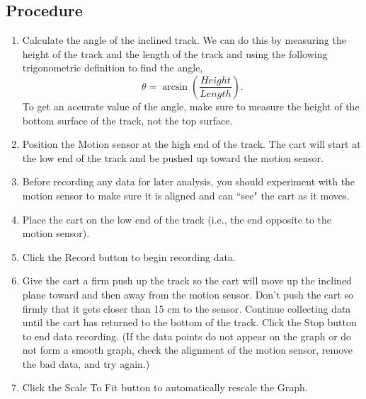 \documentclass[main.tex]{subfiles}
\begin{document}
\subsection*{Procedure}
\begin{enumerate}
\item
Calculate the angle of the inclined track. We can do this by measuring the height of the track and the length of the track and using the following trigonometric definition to find the angle,
\[
\theta=\arcsin\left(\frac{Height}{Length}\right).
\]
To get an accurate value of the angle, make sure to measure the height of the bottom surface of the track, not the top surface.
\item
Position the Motion sensor at the high end of the track. The cart will start at the low end of the track and be pushed up toward the motion sensor.
\item
Before recording any data for later analysis, you should experiment with the motion sensor to make sure it is aligned and can ``see" the cart as it moves.
\item
Place the cart on the low end of the track (i.e., the end opposite to the motion sensor).
\item
Click the Record button to begin recording data. 
\item
Give the cart a firm push up the track so the cart will move up the inclined plane toward and then away from the motion sensor. Don't push the cart so firmly that it gets closer than 15 cm to the sensor. Continue collecting data until the cart has returned to the bottom of the track. Click the Stop button to end data recording. (If the data points do not appear on the graph or do not form a smooth graph, check the alignment of the motion sensor, remove the bad data, and try again.)
\item
Click the Scale To Fit button to automatically rescale the Graph.
\end{enumerate}
\end{document}
